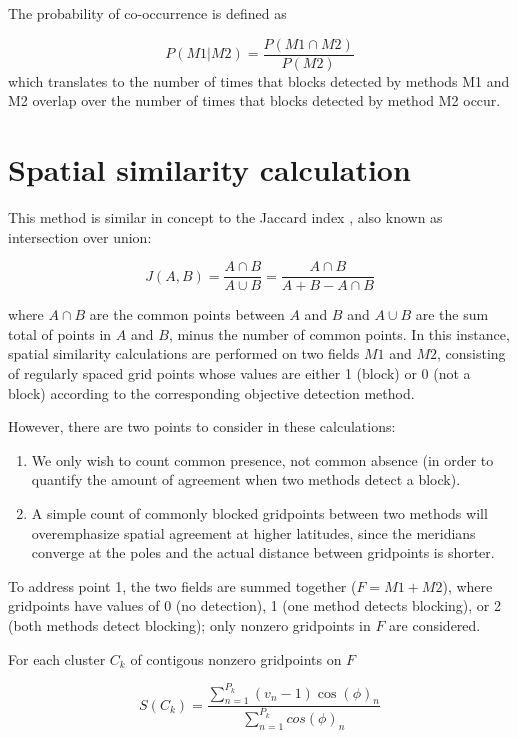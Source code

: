 \documentclass[smallextended]{svjour3}       %
\numberwithin{equation}{section}
\begin{document}
\begin{appendices}
The probability of co-occurrence is defined as 

\begin{equation}
P(M1|M2) = \frac{P(M1\cap M2)}{P(M2)}
\end{equation} which translates to the number of times that blocks detected by methods M1 and M2 overlap over the number of times that blocks detected by method M2 occur.


\section{Spatial similarity calculation}\label{simcalc}

This method is similar in concept to the Jaccard index \citep{jaccard_nouvelles_1908}, also known as intersection over union:

\begin{equation}
J(A,B) = \frac{A\cap B}{A\cup B} = \frac{A\cap B}{A+B-A\cap B}
\end{equation}

\noindent
where $A\cap B$ are the common points between $A$ and $B$ and $A\cup B$ are the sum total of points in $A$ and $B$, minus the number of common points. In this instance, spatial similarity calculations are performed on two fields $M1$ and $M2$, consisting of regularly spaced grid points whose values are either 1 (block) or 0 (not a block) according to the corresponding objective detection method. 

However, there are two points to consider in these calculations:
\begin{enumerate}
\item We only wish to count common presence, not common absence (in order to quantify the amount of agreement when two methods detect a block).
\item A simple count of commonly blocked gridpoints between two methods will overemphasize spatial agreement at higher latitudes, since the meridians converge at the poles and the actual distance between gridpoints is shorter.
\end{enumerate}

To address point 1, the two fields are summed together ($F=M1+M2$), where gridpoints have values of  0 (no detection), 1 (one method detects blocking), or 2 (both methods detect blocking); only nonzero gridpoints in $F$ are considered. 

For each cluster $C_k$ of contigous nonzero gridpoints on $F$

\begin{equation}
S(C_k) = \frac{\sum\limits_{n=1}^{P_k}\left(v_n-1\right)\cos(\phi)_n}{\sum\limits_{n=1}^{P_k}cos(\phi)_n}
\end{equation}


\end{appendices}
\end{document}
